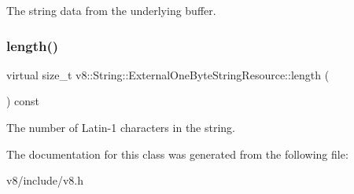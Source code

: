 The string data from the underlying buffer. \mbox{\label{classv8_1_1String_1_1ExternalOneByteStringResource_ad6b702f05798bcfc3975cb922f32b5ab}} 
\subsubsection{\texorpdfstring{length()}{length()}}
{\footnotesize\ttfamily virtual size\+\_\+t v8\+::\+String\+::\+External\+One\+Byte\+String\+Resource\+::length (\begin{DoxyParamCaption}{ }\end{DoxyParamCaption}) const\hspace{0.3cm}{\ttfamily [pure virtual]}}

The number of Latin-\/1 characters in the string. 

The documentation for this class was generated from the following file\+:\begin{DoxyCompactItemize}
\item 
v8/include/v8.\+h\end{DoxyCompactItemize}
